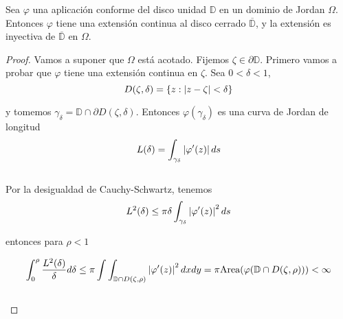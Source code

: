 \bigskip

\begin{theorem}
Sea $\varphi$ una aplicación conforme del disco unidad $\mathbb{D}$ en un dominio de Jordan $\Omega$. Entonces $\varphi$ tiene una extensión continua al disco cerrado $\overline{\mathbb{D}}$, y la extensión es inyectiva de $\overline{\mathbb{D}}$ en $\Omega$.
\end{theorem}

\begin{proof}
Vamos a suponer que $\Omega$ está acotado. Fijemos $\zeta \in \partial \mathbb{D}$. Primero vamos a probar que $\varphi$ tiene una extensión continua en $\zeta$. Sea $0 < \delta < 1$,
\begin{equation*}
D(\zeta, \delta) = \{z: \left\lvert z - \zeta\right\rvert < \delta \}
\end{equation*}

y tomemos $\gamma_{\delta} = \mathbb{D} \cap \partial D(\zeta, \delta)$. Entonces $\varphi (\gamma_{\delta})$ es una curva de Jordan de longitud
\begin{equation*}
L(\delta) = \int_{\gamma_{\delta}} \left\lvert\varphi ' (z)\right\rvert ds
\end{equation*}
\\
Por la desigualdad de Cauchy-Schwartz, tenemos
\begin{equation*}
L^2(\delta) \leq \pi \delta \int_{\gamma_{\delta}} \left\lvert\varphi ' (z)\right\rvert^2 ds
\end{equation*}

entonces para $\rho < 1$

\begin{equation*}
\int_{0}^{\rho} \frac{L^2(\delta)}{\delta} d\delta \leq \pi \int \int_{\mathbb{D} \cap D(\zeta, \rho)} \left\lvert\varphi ' (z)\right\rvert^2 dxdy = \pi \text{Area}(\varphi(\mathbb{D} \cap D(\zeta, \rho))) < \infty
\end{equation*}
\\


\end{proof}

